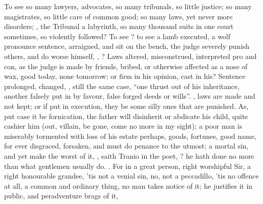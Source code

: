 To see so many lawyers, advocates, so many tribunals, so little justice; so
many magistrates, so little care of common good; so many laws, yet never more
disorders; , the Tribunal a labyrinth, so many
thousand suits in one court sometimes, so violently followed? To see
? to see a lamb
executed, a wolf pronounce sentence,  arraigned,
and  sit on the bench, the judge severely punish others, and do worse
himself, ,
? Laws altered,
misconstrued, interpreted pro and con, as the judge is made
by friends, bribed, or otherwise affected as a nose of wax, good today, none
tomorrow; or firm in his opinion, cast in his? Sentence prolonged, changed,
, still the same case, \enquote{one thrust
out of his inheritance, another falsely put in by favour, false forged deeds or
wills}. , laws are made and not kept; or if put
in execution, they be some silly ones that are punished.
As, put case it be fornication, the father will disinherit or abdicate his
child, quite cashier him (out, villain, be gone, come no more in my sight); a
poor man is miserably tormented with loss of his estate perhaps, goods,
fortunes, good name, for ever disgraced, forsaken, and must do penance to the
utmost; a mortal sin, and yet make the worst of it, ,
saith Tranio in the poet, ? he hath done no more than what gentlemen usually do.
. For in a great person, right worshipful Sir, a right honourable
grandee, 'tis not a venial sin, no, not a peccadillo, 'tis no offence at all, a
common and ordinary thing, no man takes notice of it; he justifies it in
public, and peradventure brags of it,


